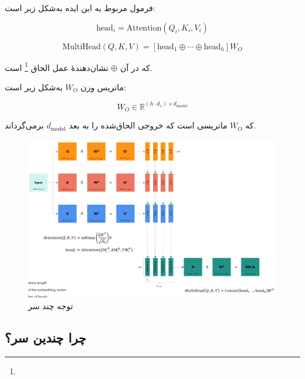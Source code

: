 فرمول مربوط به این ایده به‌شکل زیر است:


\begin{equation}
	\text{head}_i = \text{Attention}(Q_i, K_i, V_i)
	\label{eq:head_i}
\end{equation}


\begin{equation}
	\text{MultiHead}(Q, K, V) = [\text{head}_1 \oplus \cdots \oplus \text{head}_h] W_O
	\label{eq:multihead}
\end{equation}

که در آن \( \oplus \) نشان‌دهندهٔ عمل الحاق \footnote{} است.

ماتریس وزن \( W_O \) به‌شکل زیر است:

\[
W_O \in \mathbb{R}^{(h \cdot d_v) \times d_{\text{model}}}
\]

که \( W_O \) ماتریسی است که خروجی الحاق‌شده را به بعد \( d_{\text{model}} \) برمی‌گرداند.





\begin{figure}[h]
	\centering
	\begin{minipage}[b]{0.9\textwidth}
		\centering
		\includegraphics[width=\textwidth]{transformer_images/multi_head_attention.png}
		\caption{توجه چند سر}
		\label{fig:attention}
	\end{minipage}
	\hfill
	
\end{figure}



\subsection*{چرا چندین سر؟}

